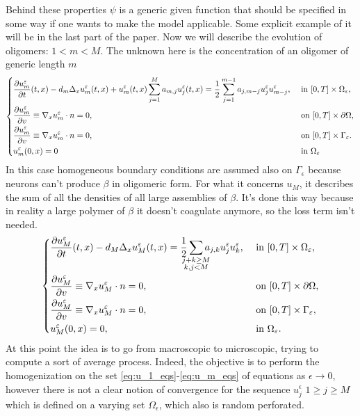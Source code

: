 Behind these properties $\psi $ is a generic given function that should be specified in some way if one wants to make the model applicable. Some explicit example of it will be in the last part of the paper.
Now we will describe the evolution of oligomers: $1<m<M$. The unknown here is the concentration of an oligomer of generic length $m$
\begin{equation}
    \begin{dcases}
        \frac{\partial u_{m}^{\epsilon}}{\partial t}(t, x)-d_{m} \Delta_{x} u_{m}^{\epsilon}(t, x)+u_{m}^{\epsilon}(t, x) \sum_{j=1}^{M} a_{m, j} u_{j}^{\epsilon}(t, x)= \frac{1}{2} \sum_{j=1}^{m-1} a_{j, m-j} u_{j}^{\epsilon} u_{m-j}^{\epsilon}, & \text { in }[0, T] \times \Omega_{\epsilon},\\
        \frac{\partial u_{m}^{\epsilon}}{\partial v} \equiv \nabla_{x} u_{m}^{\epsilon} \cdot n=0,  & \text { on }[0, T]\times\partial\Omega, \\
        \frac{\partial u_{m}^{\epsilon}}{\partial v} \equiv \nabla_{x} u_{m}^{\epsilon} \cdot n=0, & \text { on }[0, T]\times\Gamma_{\epsilon}.\\ 
     u_{m}^{\epsilon}(0, x)=0 & \text{ in } \Omega_{\epsilon}
    \end{dcases}
\label{eq:u_m_eqs}\end{equation}
In this case homogeneous boundary conditions are assumed also on $\Gamma_{\epsilon}$ because neurons can't produce \(\beta\) in oligomeric form.
For what it concerns $u_{M}$, it describes the sum of all the densities of all large assemblies of \(\beta\). It's done this way because in reality a large polymer of \(\beta\) it doesn't coagulate anymore, so the loss term isn't needed.
\begin{equation}
    \begin{dcases}
        \frac{\partial u_{M}^{\epsilon}}{\partial t}(t, x)-d_{M} \Delta_{x} u_{M}^{\epsilon}(t, x)= \frac{1}{2} \sum_{\mathclap{\substack{j+k\geq M\\k,j<M}}} a_{j, k} u_{j}^{\epsilon} u_{k}^{\epsilon}, & \text { in }[0, T] \times \Omega_{\epsilon},\\
        \frac{\partial u_{M}^{\epsilon}}{\partial v} \equiv \nabla_{x} u_{M}^{\epsilon} \cdot n=0,  & \text { on }[0, T]\times\partial\Omega,
        \\
        \frac{\partial u_{M}^{\epsilon}}{\partial v} \equiv \nabla_{x} u_{M}^{\epsilon} \cdot n=0, & \text { on }[0, T]\times\Gamma_{\epsilon},\\ 
        u_{M}^{\epsilon}(0, x)=0, & \text{ in }\Omega_{\epsilon}.
    \end{dcases}
    \label{eq:u_M_eqs}
\end{equation}
At this point the idea is to go from macroscopic to microscopic, trying to compute a sort of average process. Indeed, the objective is to perform the homogenization on the set \eqref{eq:u_1_eqs}-\eqref{eq:u_m_eqs} of equations as $\epsilon \rightarrow 0$, however there is not a clear notion of convergence for the sequence $u_j^{\epsilon}$ $1\geq j \geq M$ which is defined on a varying set $\Omega_{\epsilon}$, which also is random perforated.

